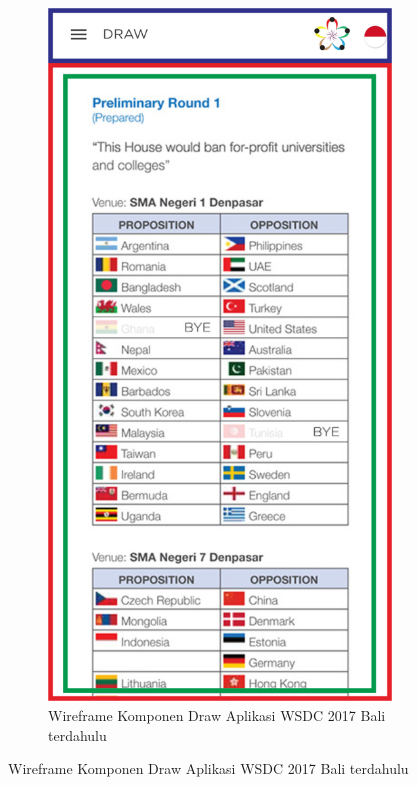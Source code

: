 \begin{enumerate}
\begin{figure}[H]
\begin{subfigure}[b]{0.43\textwidth}
         	\includegraphics[scale=0.465]{Gambar/DrawPageWireframe.png}
         	\caption{Wireframe Komponen Draw Aplikasi WSDC 2017 Bali terdahulu}
         	\label{fig:drawPageWireframe}
     	\end{subfigure}

\end{figure}
\end{enumerate}
